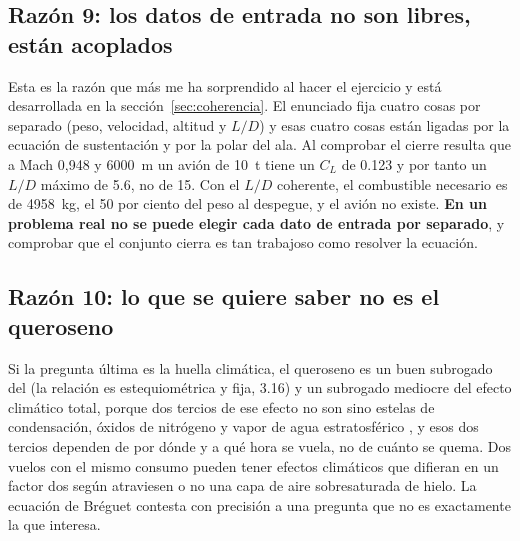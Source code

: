 \documentclass[11pt,letterpaper]{article}
\begin{document}
\subsection{Razón 9: los datos de entrada no son libres, están acoplados}

Esta es la razón que más me ha sorprendido al hacer el ejercicio y está
desarrollada en la sección~\ref{sec:coherencia}. El enunciado fija cuatro cosas
por separado (peso, velocidad, altitud y \(L/D\)) y esas cuatro cosas están
ligadas por la ecuación de sustentación y por la polar del ala. Al comprobar el
cierre resulta que a Mach 0,948 y \SI{6000}{\meter} un avión de
\SI{10}{\tonne} tiene un \(C_L\) de \num{0.123} y por tanto un \(L/D\) máximo
de \num{5.6}, no de 15. Con el \(L/D\) coherente, el combustible necesario es
de \SI{4958}{\kilogram}, el 50 por ciento del peso al despegue, y el avión no
existe. \textbf{En un problema real no se puede elegir cada dato de entrada por
separado}, y comprobar que el conjunto cierra es tan trabajoso como resolver la
ecuación.

\subsection{Razón 10: lo que se quiere saber no es el queroseno}

Si la pregunta última es la huella climática, el queroseno es un buen
subrogado del  (la relación es estequiométrica y fija, \num{3.16}) y un
subrogado mediocre del efecto climático total, porque dos tercios de ese efecto
no son  sino estelas de condensación, óxidos de nitrógeno y vapor de
agua estratosférico \parencite{lee2021}, y esos dos tercios dependen de por
dónde y a qué hora se vuela, no de cuánto se quema. Dos vuelos con el mismo
consumo pueden tener efectos climáticos que difieran en un factor dos según
atraviesen o no una capa de aire sobresaturada de hielo. La ecuación de Bréguet
contesta con precisión a una pregunta que no es exactamente la que interesa.
\end{document}
